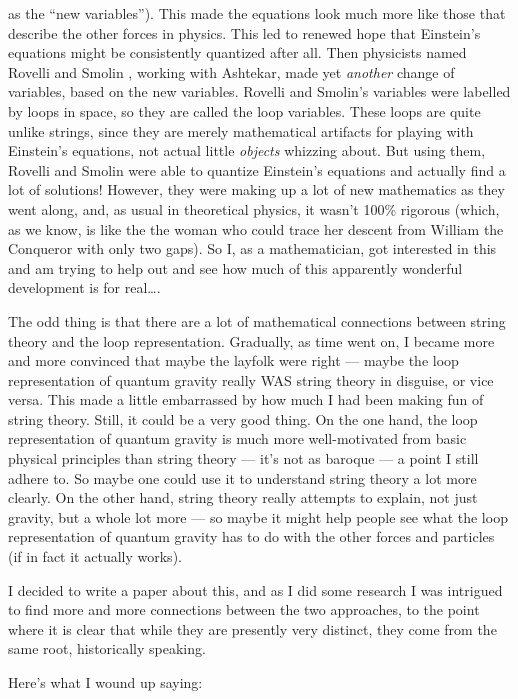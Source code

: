 \documentclass[12pt]{article}
\begin{document}
as the ``new variables''). This made the equations look much more like
those that describe the other forces in physics. This led to renewed
hope that Einstein's equations might be consistently quantized after
all. Then physicists named Rovelli and Smolin , working with Ashtekar,
made yet \emph{another} change of variables, based on the new variables.
Rovelli and Smolin's variables were labelled by loops in space, so they
are called the loop variables. These loops are quite unlike strings,
since they are merely mathematical artifacts for playing with Einstein's
equations, not actual little \emph{objects} whizzing about. But using
them, Rovelli and Smolin were able to quantize Einstein's equations and
actually find a lot of solutions! However, they were making up a lot of
new mathematics as they went along, and, as usual in theoretical
physics, it wasn't 100\% rigorous (which, as we know, is like the the
woman who could trace her descent from William the Conqueror with only
two gaps). So I, as a mathematician, got interested in this and am
trying to help out and see how much of this apparently wonderful
development is for real\ldots.

The odd thing is that there are a lot of mathematical connections
between string theory and the loop representation. Gradually, as time
went on, I became more and more convinced that maybe the layfolk were
right --- maybe the loop representation of quantum gravity really WAS
string theory in disguise, or vice versa. This made a little embarrassed
by how much I had been making fun of string theory. Still, it could be a
very good thing. On the one hand, the loop representation of quantum
gravity is much more well-motivated from basic physical principles than
string theory --- it's not as baroque --- a point I still adhere to. So
maybe one could use it to understand string theory a lot more clearly.
On the other hand, string theory really attempts to explain, not just
gravity, but a whole lot more --- so maybe it might help people see what
the loop representation of quantum gravity has to do with the other
forces and particles (if in fact it actually works).

I decided to write a paper about this, and as I did some research I was
intrigued to find more and more connections between the two approaches,
to the point where it is clear that while they are presently very
distinct, they come from the same root, historically speaking.

Here's what I wound up saying:
\end{document}
